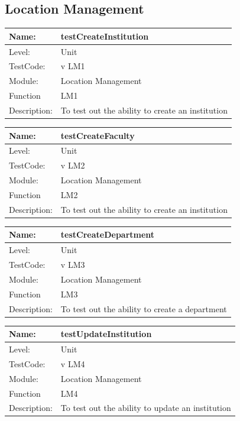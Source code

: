 \documentclass[12pt]{article}
\begin{document}
\subsection{Location Management}
\begin{center}
\begin{tabular}{|l|p{12cm}|}
\hline

 Name: & testCreateInstitution\\
 \hline
Level: & Unit \\
\hline
TestCode: & v LM1 \\
\hline
Module:& Location Management \\
\hline
Function & LM1 \\
\hline
Description: & To test out the ability to create an institution  \\
\hline
\end{tabular}
\end{center}

\begin{center}
\begin{tabular}{|l|p{12cm}|}
\hline

 Name: & testCreateFaculty\\ 
 \hline
Level: & Unit \\
\hline
TestCode: & v LM2 \\
\hline
Module:& Location Management \\
\hline
Function & LM2 \\
\hline
Description: & To test out the ability to create an institution  \\
\hline
\end{tabular}
\end{center}

\begin{center}
\begin{tabular}{|l|p{12cm}|}
\hline

 Name: & testCreateDepartment\\
 \hline
Level: & Unit \\
\hline
TestCode: & v LM3 \\
\hline
Module:& Location Management \\
\hline
Function & LM3 \\
\hline
Description: & To test out the ability to create a department  \\
\hline
\end{tabular}
\end{center}

\begin{center}
\begin{tabular}{|l|p{12cm}|}
\hline

 Name: & testUpdateInstitution\\
 \hline
Level: & Unit \\
\hline
TestCode: & v LM4 \\
\hline
Module:& Location Management \\
\hline
Function & LM4 \\
\hline
Description: & To test out the ability to update an institution  \\
\hline
\end{tabular}
\end{center}
\end{document}
